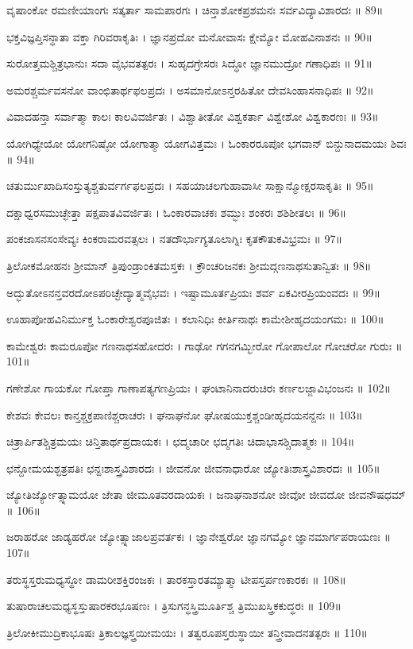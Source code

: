 ವೃಷಾಂಕೋ ರಮಣೀಯಾಂಗಃ ಸತ್ಕರ್ತಾ ಸಾಮಪಾರಗಃ ।
ಚಿನ್ತಾಶೋಕಪ್ರಶಮನಃ ಸರ್ವವಿದ್ಯಾವಿಶಾರದಃ ॥ 89॥

ಭಕ್ತವಿಜ್ಞಪ್ತಿಸನ್ಧಾತಾ ವಕ್ತಾ ಗಿರಿವರಾಕೃತಿಃ ।
ಜ್ಞಾನಪ್ರದೋ ಮನೋವಾಸಃ ಕ್ಷೇಮ್ಯೋ ಮೋಹವಿನಾಶನಃ ॥ 90॥

ಸುರೋತ್ತಮಶ್ಚಿತ್ರಭಾನುಃ ಸದಾ ವೈಭವತತ್ಪರಃ ।
ಸುಹೃದಗ್ರೇಸರಃ ಸಿದ್ಧೋ ಜ್ಞಾನಮುದ್ರೋ ಗಣಾಧಿಪಃ ॥ 91॥

ಅಮರಶ್ಚರ್ಮವಸನೋ ವಾಂಛಿತಾರ್ಥಫಲಪ್ರದಃ ।
ಅಸಮಾನೋಽನ್ತರಹಿತೋ ದೇವಸಿಂಹಾಸನಾಧಿಪಃ ॥ 92॥

ವಿವಾದಹನ್ತಾ ಸರ್ವಾತ್ಮಾ ಕಾಲಃ ಕಾಲವಿವರ್ಜಿತಃ ।
ವಿಶ್ವಾತೀತೋ ವಿಶ್ವಕರ್ತಾ ವಿಶ್ವೇಶೋ ವಿಶ್ವಕಾರಣಃ ॥ 93॥

ಯೋಗಿಧ್ಯೇಯೋ ಯೋಗನಿಷ್ಠೋ ಯೋಗಾತ್ಮಾ ಯೋಗವಿತ್ತಮಃ ।
ಓಂಕಾರರೂಪೋ ಭಗವಾನ್ ಬಿನ್ದುನಾದಮಯಃ ಶಿವಃ ॥ 94॥

ಚತುರ್ಮುಖಾದಿಸಂಸ್ತುತ್ಯಶ್ಚತುರ್ವರ್ಗಫಲಪ್ರದಃ ।
ಸಹಯಾಚಲಗುಹಾವಾಸೀ ಸಾಕ್ಷಾನ್ಮೋಕ್ಷರಸಾಕೃತಿಃ ॥ 95॥

ದಕ್ಷಾಧ್ವರಸಮುಚ್ಛೇತ್ತಾ ಪಕ್ಷಪಾತವಿವರ್ಜಿತಃ ।
ಓಂಕಾರವಾಚಕಃ ಶಮ್ಭುಃ ಶಂಕರಃ ಶಶಿಶೀತಲಃ ॥ 96॥

ಪಂಕಜಾಸನಸಂಸೇವ್ಯಃ ಕಿಂಕರಾಮರವತ್ಸಲಃ ।
ನತದೌರ್ಭಾಗ್ಯತೂಲಾಗ್ನಿಃ ಕೃತಕೌತುಕವಿಭ್ರಮಃ ॥ 97॥

ತ್ರಿಲೋಕಮೋಹನಃ ಶ್ರೀಮಾನ್ ತ್ರಿಪುಂಡ್ರಾಂಕಿತಮಸ್ತಕಃ ।
ಕ್ರೌಂಚರಿಜನಕಃ ಶ್ರೀಮದ್ಗಣನಾಥಸುತಾನ್ವಿತಃ ॥ 98॥

ಅದ್ಭುತೋಽನನ್ತವರದೋಽಪರಿಚ್ಛೇದ್ಯಾತ್ಮವೈಭವಃ ।
ಇಷ್ಟಾಮೂರ್ತಪ್ರಿಯಃ ಶರ್ವ ಏಕವೀರಪ್ರಿಯಂವದಃ ॥ 99॥

ಊಹಾಪೋಹವಿನಿರ್ಮುಕ್ತ ಓಂಕಾರೇಶ್ವರಪೂಜಿತಃ ।
ಕಲಾನಿಧಿಃ ಕೀರ್ತಿನಾಥಃ ಕಾಮೇಶೀಹೃದಯಂಗಮಃ ॥ 100॥

ಕಾಮೇಶ್ವರಃ ಕಾಮರೂಪೋ ಗಣನಾಥಸಹೋದರಃ ।
ಗಾಢೋ ಗಗನಗಮ್ಭೀರೋ ಗೋಪಾಲೋ ಗೋಚರೋ ಗುರುಃ ॥ 101॥

ಗಣೇಶೋ ಗಾಯಕೋ ಗೋಪ್ತಾ ಗಾಣಾಪತ್ಯಗಣಪ್ರಿಯಃ ।
ಘಂಟಾನಿನಾದರುಚಿರಃ ಕರ್ಣಲಜ್ಜಾವಿಭಂಜನಃ ॥ 102॥

ಕೇಶವಃ ಕೇವಲಃ ಕಾನ್ತಶ್ಚಕ್ರಪಾಣಿಶ್ಚರಾಚರಃ ।
ಘನಾಘನೋ ಘೋಷಯುಕ್ತಶ್ಚಂಡೀಹೃದಯನನ್ದನಃ ॥ 103॥

ಚಿತ್ರಾರ್ಪಿತಶ್ಚಿತ್ರಮಯಃ ಚಿನ್ತಿತಾರ್ಥಪ್ರದಾಯಕಃ ।
ಛದ್ಮಚಾರೀ ಛದ್ಮಗತಿಃ ಚಿದಾಭಾಸಶ್ಚಿದಾತ್ಮಕಃ ॥ 104॥

ಛನ್ದೋಮಯಶ್ಛತ್ರಪತಿಃ ಛನ್ದಃಶಾಸ್ತ್ರವಿಶಾರದಃ ।
ಜೀವನೋ ಜೀವನಾಧಾರೋ ಜ್ಯೋತಿಃಶಾಸ್ತ್ರವಿಶಾರದಃ ॥ 105॥

ಜ್ಯೋತಿರ್ಜ್ಯೋತ್ಸ್ನಾಮಯೋ ಜೇತಾ ಜೀಮೂತವರದಾಯಕಃ ।
ಜನಾಘನಾಶನೋ ಜೀವೋ ಜೀವದೋ ಜೀವನೌಷಧಮ್ ॥ 106॥

ಜರಾಹರೋ ಜಾಡ್ಯಹರೋ ಜ್ಯೋತ್ಸ್ನಾಜಾಲಪ್ರವರ್ತಕಃ ।
ಜ್ಞಾನೇಶ್ವರೋ ಜ್ಞಾನಗಮ್ಯೋ ಜ್ಞಾನಮಾರ್ಗಪರಾಯಣಃ ॥ 107॥

ತರುಸ್ಥಸ್ತರುಮಧ್ಯಸ್ಥೋ ಡಾಮರೀಶಕ್ತಿರಂಜಕಃ ।
ತಾರಕಸ್ತಾರತಮ್ಯಾತ್ಮಾ ಟೀಪಸ್ತರ್ಪಣಕಾರಕಃ ॥ 108॥

ತುಷಾರಾಚಲಮಧ್ಯಸ್ಥಸ್ತುಷಾರಕರಭೂಷಣಃ ।
ತ್ರಿಸುಗನ್ಧಸ್ತ್ರಿಮೂರ್ತಿಶ್ಚ ತ್ರಿಮುಖಸ್ತ್ರಿಕಕುದ್ಧರಃ ॥ 109॥

ತ್ರಿಲೋಕೀಮುದ್ರಿಕಾಭೂಷಃ ತ್ರಿಕಾಲಜ್ಞಸ್ತ್ರಯೀಮಯಃ ।
ತತ್ವರೂಪಸ್ತರುಸ್ಥಾಯೀ ತನ್ತ್ರೀವಾದನತತ್ಪರಃ ॥ 110॥

